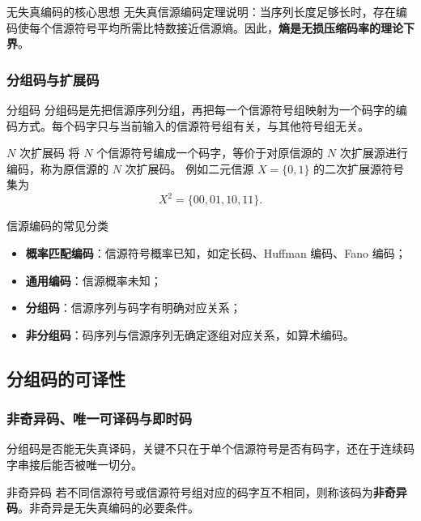 \begin{keypoint}{无失真编码的核心思想}
无失真信源编码定理说明：当序列长度足够长时，存在编码使每个信源符号平均所需比特数接近信源熵。因此，\textbf{熵是无损压缩码率的理论下界}。
\end{keypoint}

\subsubsection{分组码与扩展码}

\begin{definitionBox}{分组码}
分组码是先把信源序列分组，再把每一个信源符号组映射为一个码字的编码方式。每个码字只与当前输入的信源符号组有关，与其他符号组无关。
\end{definitionBox}

\begin{definitionBox}{$N$ 次扩展码}
将 $N$ 个信源符号编成一个码字，等价于对原信源的 $N$ 次扩展源进行编码，称为原信源的 $N$ 次扩展码。
例如二元信源 $X=\{0,1\}$ 的二次扩展源符号集为
\[
X^2=\{00,01,10,11\}.
\]
\end{definitionBox}

\begin{methodBox}{信源编码的常见分类}
\begin{itemize}
  \item \textbf{概率匹配编码}：信源符号概率已知，如定长码、Huffman 编码、Fano 编码；
  \item \textbf{通用编码}：信源概率未知；
  \item \textbf{分组码}：信源序列与码字有明确对应关系；
  \item \textbf{非分组码}：码序列与信源序列无确定逐组对应关系，如算术编码。
\end{itemize}
\end{methodBox}

\subsection{分组码的可译性}

\subsubsection{非奇异码、唯一可译码与即时码}
分组码是否能无失真译码，关键不只在于单个信源符号是否有码字，还在于连续码字串接后能否被唯一切分。

\begin{definitionBox}{非奇异码}
若不同信源符号或信源符号组对应的码字互不相同，则称该码为\textbf{非奇异码}。非奇异是无失真编码的必要条件。
\end{definitionBox}

